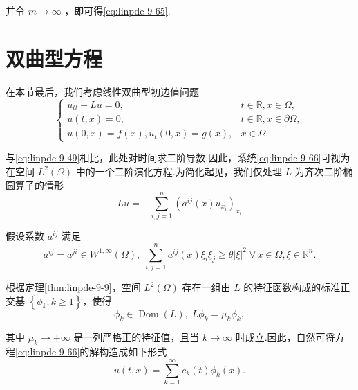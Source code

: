 并令 $m \rightarrow  \infty$ ，即可得\eqref{eq:linpde-9-65}.

\section{双曲型方程}

在本节最后，我们考虑线性双曲型初边值问题
\begin{equation}\tag{9.66}\label{eq:linpde-9-66}
\begin{cases} {u}_{tt} + {Lu} = 0, & t \in  \mathbb{R},x \in  \Omega , \\  u\left( {t,x}\right) = 0, & t \in  \mathbb{R},x \in  \partial \Omega , \\  u\left( {0,x}\right)  = f\left( x\right) ,{u}_{t}\left( {0,x}\right)  = g\left( x\right) , & x \in  \Omega . \end{cases}
\end{equation}

与\eqref{eq:linpde-9-49}相比，此处对时间求二阶导数.因此，系统\eqref{eq:linpde-9-66}可视为在空间 ${L}^{2}\left( \Omega \right)$ 中的一个二阶演化方程.为简化起见，我们仅处理 $L$ 为齐次二阶椭圆算子的情形
\begin{equation}\tag{9.67}\label{eq:linpde-9-67}
{Lu} =  - \sum_{{i,j = 1}}^{n}{\left( {a}^{ij}\left( x\right) {u}_{{x}_{i}}\right) }_{{x}_{i}}
\end{equation}

假设系数 ${a}^{ij}$ 满足
\begin{equation}\tag{9.68}\label{eq:linpde-9-68}
{a}^{ij} = {a}^{ji} \in  {W}^{1,\infty }\left( \Omega \right) ,\;\sum_{{i,j = 1}}^{n}{a}^{ij}\left( x\right) {\xi }_{i}{\xi }_{j} \geq  \theta {\left| \xi \right| }^{2}\;\forall\,x \in  \Omega ,\xi  \in  {\mathbb{R}}^{n}.
\end{equation}

根据定理\ref{thm:linpde-9-9}，空间 ${L}^{2}\left( \Omega \right)$ 存在一组由 $L$ 的特征函数构成的标准正交基 $\left\{  {{\phi }_{k};k \geq  1}\right\}$，使得
\begin{equation}\tag{9.69}\label{eq:linpde-9-69}
{\phi }_{k} \in  \operatorname{Dom}\left( L\right) ,\;L{\phi }_{k} = {\mu }_{k}{\phi }_{k},
\end{equation}

其中 ${\mu }_{k} \rightarrow   + \infty$ 是一列严格正的特征值，且当 $k \rightarrow  \infty$ 时成立.因此，自然可将方程\eqref{eq:linpde-9-66}的解构造成如下形式
\begin{equation}\tag{9.70}\label{eq:linpde-9-70}
u\left( {t,x}\right)  = \sum_{{k = 1}}^{\infty }{c}_{k}\left( t\right) {\phi }_{k}\left( x\right) .
\end{equation}

